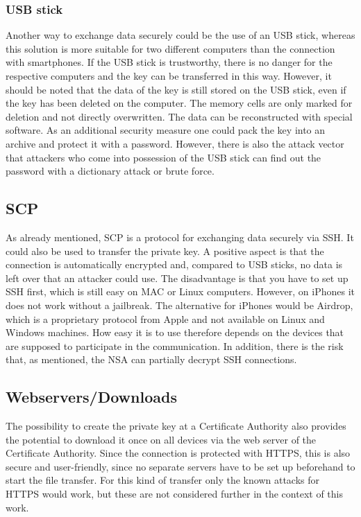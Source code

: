 \documentclass[12pt,oneside,a4paper,parskip]{scrbook}
\begin{document}
\subsubsection{USB stick}
Another way to exchange data securely could be the use of an USB stick, whereas this solution is more suitable for two different computers than the connection with smartphones. If the USB stick is trustworthy, there is no danger for the respective computers and the key can be transferred in this way. However, it should be noted that the data of the key is still stored on the USB stick, even if the key has been deleted on the computer. The memory cells are only marked for deletion and not directly overwritten. The data can be reconstructed with special software. As an additional security measure one could pack the key into an archive and protect it with a password. However, there is also the attack vector that attackers who come into possession of the USB stick can find out the password with a dictionary attack or brute force.

\subsection{SCP}
As already mentioned, SCP is a protocol for exchanging data securely via SSH. It could also be used to transfer the private key. A positive aspect is that the connection is automatically encrypted and, compared to USB sticks, no data is left over that an attacker could use. The disadvantage is that you have to set up SSH first, which is still easy on MAC or Linux computers. However, on iPhones it does not work without a jailbreak. The alternative for iPhones would be Airdrop, which is a proprietary protocol from Apple and not available on Linux and Windows machines. How easy it is to use therefore depends on the devices that are supposed to participate in the communication. In addition, there is the risk that, as mentioned, the NSA can partially decrypt SSH connections.

\subsection{Webservers/Downloads}
The possibility to create the private key at a Certificate Authority also provides the potential to download it once on all devices via the web server of the Certificate Authority. Since the connection is protected with HTTPS, this is also secure and user-friendly, since no separate servers have to be set up beforehand to start the file transfer. For this kind of transfer only the known attacks for HTTPS would work, but these are not considered further in the context of this work.
\end{document}
